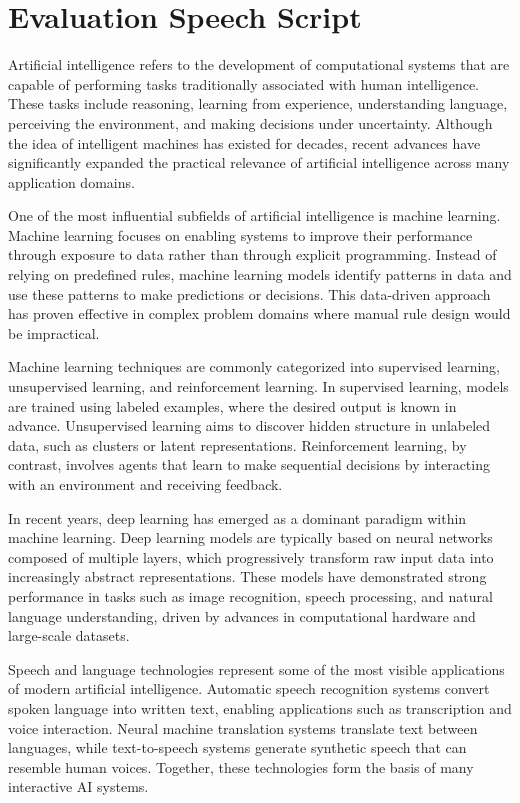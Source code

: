\chapter{Evaluation Speech Script}
\label{appendix:script}

Artificial intelligence refers to the development of computational systems that are capable of performing tasks traditionally associated with human intelligence. These tasks include reasoning, learning from experience, understanding language, perceiving the environment, and making decisions under uncertainty. Although the idea of intelligent machines has existed for decades, recent advances have significantly expanded the practical relevance of artificial intelligence across many application domains.

One of the most influential subfields of artificial intelligence is machine learning. Machine learning focuses on enabling systems to improve their performance through exposure to data rather than through explicit programming. Instead of relying on predefined rules, machine learning models identify patterns in data and use these patterns to make predictions or decisions. This data-driven approach has proven effective in complex problem domains where manual rule design would be impractical.

Machine learning techniques are commonly categorized into supervised learning, unsupervised learning, and reinforcement learning. In supervised learning, models are trained using labeled examples, where the desired output is known in advance. Unsupervised learning aims to discover hidden structure in unlabeled data, such as clusters or latent representations. Reinforcement learning, by contrast, involves agents that learn to make sequential decisions by interacting with an environment and receiving feedback.

In recent years, deep learning has emerged as a dominant paradigm within machine learning. Deep learning models are typically based on neural networks composed of multiple layers, which progressively transform raw input data into increasingly abstract representations. These models have demonstrated strong performance in tasks such as image recognition, speech processing, and natural language understanding, driven by advances in computational hardware and large-scale datasets.

Speech and language technologies represent some of the most visible applications of modern artificial intelligence. Automatic speech recognition systems convert spoken language into written text, enabling applications such as transcription and voice interaction. Neural machine translation systems translate text between languages, while text-to-speech systems generate synthetic speech that can resemble human voices. Together, these technologies form the basis of many interactive AI systems.

